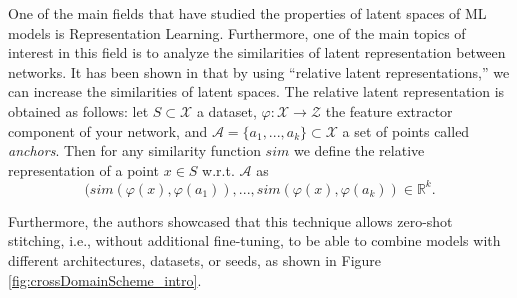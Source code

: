 \documentclass[../main.tex]{subfiles}
\begin{document}
One of the main fields that have studied the properties of latent spaces of ML models is Representation Learning. Furthermore, one of the main topics of interest in this field is to analyze the similarities of latent representation between networks. It has been shown in \cite{moschella_relative_2022} that by using ``relative latent representations,'' we can increase the similarities of latent spaces. The relative latent representation is obtained as follows: let $S\subset\mathcal{X}$ a dataset, $\varphi: \mathcal{X} \to \mathcal{Z}$ the feature extractor component of your network, and $\mathcal{A}=\{a_1, ..., a_k\}\subset\mathcal{X}$ a set of points called \emph{anchors}. Then for any similarity function $sim$ we define the relative representation of a point $x\in S$  w.r.t. $\mathcal{A}$ as
\[
(sim(\varphi(x), \varphi(a_1)), ..., sim(\varphi(x), \varphi(a_k))\in \mathbb{R}^k.
\]

Furthermore, the authors showcased that this technique allows zero-shot stitching, i.e., without additional fine-tuning, to be able to combine models with different architectures, datasets, or seeds, as shown in Figure \ref{fig:crossDomainScheme_intro}.\\
\end{document}
